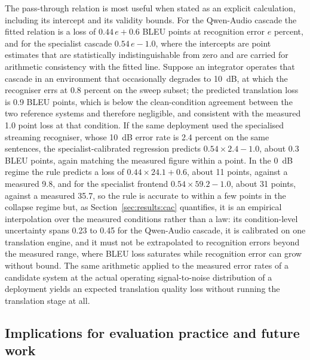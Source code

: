 The pass-through relation is most useful when stated as an explicit
calculation, including its intercept and its validity bounds. For the
Qwen-Audio cascade the fitted relation is a loss of $0.44\,e + 0.6$ BLEU
points at recognition error $e$ percent, and for the specialist cascade
$0.54\,e - 1.0$, where the intercepts are point estimates that are
statistically indistinguishable from zero and are carried for arithmetic
consistency with the fitted line. Suppose an integrator operates that
cascade in an environment that
occasionally degrades to 10~dB, at which the recogniser errs at 0.8 percent
on the sweep subset; the predicted translation loss is 0.9 BLEU points,
which is below the clean-condition agreement between the two reference
systems and therefore negligible, and consistent with the measured 1.0
point loss at that condition. If the same deployment used the specialised
streaming recogniser, whose 10~dB error rate is 2.4 percent on the same
sentences, the specialist-calibrated regression predicts $0.54 \times 2.4 -
1.0$, about 0.3 BLEU points, again matching the measured figure within a
point. In the 0~dB regime the rule predicts a loss of $0.44 \times 24.1 +
0.6$, about 11 points, against a measured 9.8, and for the specialist
frontend $0.54 \times 59.2 - 1.0$, about 31 points, against a measured
35.7, so the rule is accurate to within a few points in the collapse
regime but, as Section~\ref{sec:results:cac} quantifies, it is an
empirical interpolation over the measured conditions rather than a law:
its condition-level uncertainty spans 0.23 to 0.45 for the Qwen-Audio
cascade, it is calibrated on one translation engine, and it must not be
extrapolated to recognition errors beyond the measured range, where BLEU
loss saturates while recognition error can grow without bound. The same
arithmetic applied to the measured
error rates of a candidate system at the actual operating signal-to-noise
distribution of a deployment yields an expected translation quality loss
without running the translation stage at all.

\subsection{Implications for evaluation practice and future work}

